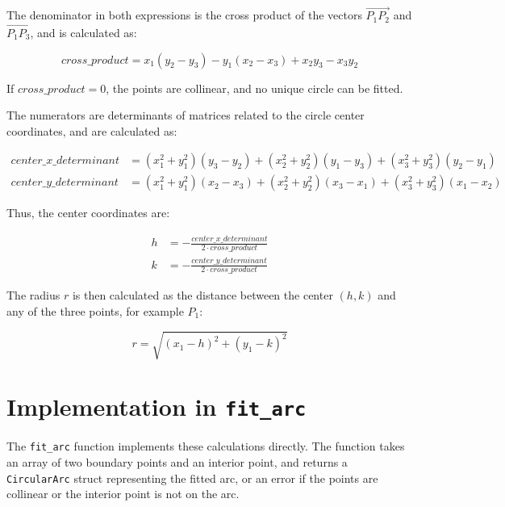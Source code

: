 \documentclass{article}
\begin{document}
The denominator in both expressions is the cross product of the vectors $\vec{P_1P_2}$ and $\vec{P_1P_3}$, and is calculated as:

$$cross\_product = x_1(y_2 - y_3) - y_1(x_2 - x_3) + x_2y_3 - x_3y_2$$

If $cross\_product = 0$, the points are collinear, and no unique circle can be fitted.

The numerators are determinants of matrices related to the circle center coordinates, and are calculated as:

\begin{align*}
center\_x\_determinant &= (x_1^2 + y_1^2)(y_3 - y_2) + (x_2^2 + y_2^2)(y_1 - y_3) + (x_3^2 + y_3^2)(y_2 - y_1) \\
center\_y\_determinant &= (x_1^2 + y_1^2)(x_2 - x_3) + (x_2^2 + y_2^2)(x_3 - x_1) + (x_3^2 + y_3^2)(x_1 - x_2)
\end{align*}

Thus, the center coordinates are:

\begin{align*}
h &= -\frac{center\_x\_determinant}{2 \cdot cross\_product} \\
k &= -\frac{center\_y\_determinant}{2 \cdot cross\_product}
\end{align*}

The radius $r$ is then calculated as the distance between the center $(h, k)$ and any of the three points, for example $P_1$:

$$r = \sqrt{(x_1 - h)^2 + (y_1 - k)^2}$$

\section{Implementation in \texttt{fit\_arc}}

The \texttt{fit\_arc} function implements these calculations directly. The function takes an array of two boundary points and an interior point, and returns a \texttt{CircularArc} struct representing the fitted arc, or an error if the points are collinear or the interior point is not on the arc.
\end{document}

